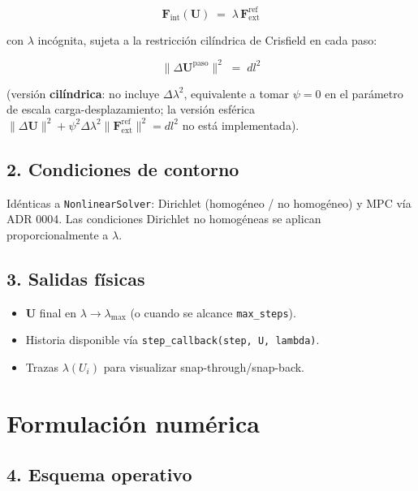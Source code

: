 \documentclass[11pt,letterpaper,oneside]{report}
\begin{document}
\[
\mathbf F_{\text{int}}(\mathbf U) \;=\; \lambda\,\mathbf F_{\text{ext}}^{\text{ref}}
\]

con $\lambda$ incógnita, sujeta a la restricción cilíndrica de Crisfield en cada paso:

\[
\lVert\Delta\mathbf U^{\text{paso}}\rVert^2 \;=\; dl^2
\]

(versión \textbf{cilíndrica}: no incluye $\Delta\lambda^2$, equivalente a tomar $\psi = 0$ en el parámetro de escala carga-desplazamiento; la versión esférica $\lVert\Delta\mathbf U\rVert^2 + \psi^2\Delta\lambda^2\lVert\mathbf F_{\text{ext}}^{\text{ref}}\rVert^2 = dl^2$ no está implementada).

\subsection{2. Condiciones de contorno}

Idénticas a \texttt{NonlinearSolver}: Dirichlet (homogéneo / no homogéneo) y MPC vía ADR 0004. Las condiciones Dirichlet no homogéneas se aplican proporcionalmente a $\lambda$.

\subsection{3. Salidas físicas}

\begin{itemize}
  \item $\mathbf U$ final en $\lambda \to \lambda_{\max}$ (o cuando se alcance \texttt{max\_steps}).
  \item Historia disponible vía \texttt{step\_callback(step, U, lambda)}.
  \item Trazas $\lambda(U_i)$ para visualizar snap-through/snap-back.
\end{itemize}


\section{Formulación numérica}

\subsection{4. Esquema operativo}
\end{document}
